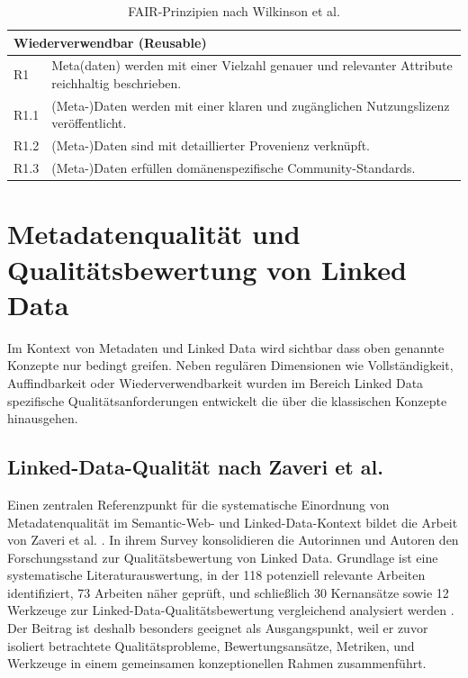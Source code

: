 \begin{table}[h!]
\begin{tabular}{|l|p{13cm}|}
        \multicolumn{2}{|l|}{\textbf{Wiederverwendbar (Reusable)}} \\ \hline
        R1 & Meta(daten) werden mit einer Vielzahl genauer und relevanter Attribute reichhaltig beschrieben. \\ \hline
        R1.1 & (Meta-)Daten werden mit einer klaren und zugänglichen Nutzungslizenz veröffentlicht. \\ \hline
        R1.2 & (Meta-)Daten sind mit detaillierter Provenienz verknüpft. \\ \hline
        R1.3 & (Meta-)Daten erfüllen domänenspezifische Community-Standards. \\ \hline
    \end{tabular}
    \captionsetup{justification=centering}
    \caption[FAIR-Prinzipien nach Wilkinson et al.]{FAIR-Prinzipien nach Wilkinson et al. \cite{wilkinson2016fair}}
    \label{tab:fair_principles}
\end{table}

\pagebreak

\section{Metadatenqualität und Qualitätsbewertung von Linked Data} %

Im Kontext von Metadaten und Linked Data wird sichtbar dass oben genannte Konzepte nur bedingt greifen.
Neben regulären Dimensionen wie Vollständigkeit, Auffindbarkeit oder Wiederverwendbarkeit wurden im Bereich Linked Data spezifische Qualitätsanforderungen entwickelt die über die klassischen Konzepte hinausgehen.

\subsection{Linked-Data-Qualität nach Zaveri et al.}

Einen zentralen Referenzpunkt für die systematische Einordnung von Metadatenqualität im Semantic-Web- und Linked-Data-Kontext bildet die Arbeit von Zaveri et al. \cite{Zaveri2016LinkedDataQuality}. In ihrem Survey konsolidieren die Autorinnen und Autoren den Forschungsstand zur Qualitätsbewertung von Linked Data. Grundlage ist eine systematische Literaturauswertung, in der 118 potenziell relevante Arbeiten identifiziert, 73 Arbeiten näher geprüft, und schließlich 30 Kernansätze sowie 12 Werkzeuge zur Linked-Data-Qualitätsbewertung vergleichend analysiert werden \cite{Zaveri2016LinkedDataQuality}. Der Beitrag ist deshalb besonders geeignet als Ausgangspunkt, weil er zuvor isoliert betrachtete Qualitätsprobleme, Bewertungsansätze, Metriken, und Werkzeuge in einem gemeinsamen konzeptionellen Rahmen zusammenführt.

